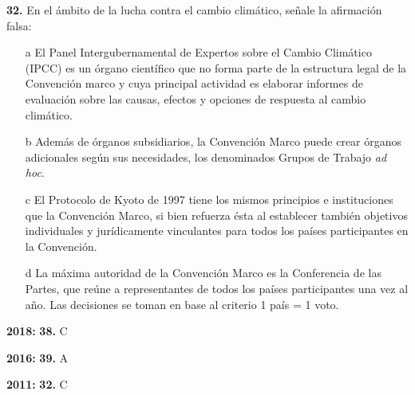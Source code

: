 \documentclass{nuevotema}
\begin{document}
\textbf{32.} En el ámbito de la lucha contra el cambio climático, señale la afirmación falsa:
\begin{itemize}
	\item[a] El Panel Intergubernamental de Expertos sobre el Cambio Climático (IPCC) es un órgano científico que no forma parte de la estructura legal de la Convención marco y cuya principal actividad es elaborar informes de evaluación sobre las causas, efectos y opciones de respuesta al cambio climático.
	\item[b] Además de órganos subsidiarios, la Convención Marco puede crear órganos adicionales según sus necesidades, los denominados Grupos de Trabajo \textit{ad hoc}.
	\item[c] El Protocolo de Kyoto de 1997 tiene los mismos principios e instituciones que la Convención Marco, si bien refuerza ésta al establecer también objetivos individuales y jurídicamente vinculantes para todos los países participantes en la Convención.
	\item[d] La máxima autoridad de la Convención Marco es la Conferencia de las Partes, que reúne a representantes de todos los países participantes una vez al año. Las decisiones se toman en base al criterio 1 país = 1 voto.
\end{itemize}

\notas

\textbf{2018:} \textbf{38.} C

\textbf{2016:} \textbf{39.} A

\textbf{2011:} \textbf{32.} C

\bibliografia
\end{document}
